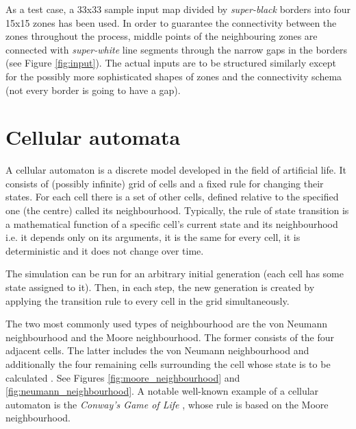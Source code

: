 \documentclass[a4paper, 11pt]{article} %
\begin{document}
As a test case, a 33x33 sample input map divided by \emph{super-black} borders into four 15x15 zones has been used. In order to guarantee the connectivity between the zones throughout the process, middle points of the neighbouring zones are connected with \emph{super-white} line segments through the narrow gaps in the borders (see Figure \ref{fig:input}). The actual inputs are to be structured similarly except for the possibly more sophisticated shapes of zones and the connectivity schema (not every border is going to have a gap).


\section*{Cellular automata}

A cellular automaton is a discrete model developed in the field of artificial life. It consists of (possibly infinite) grid of cells and a fixed rule for changing their states. For each cell there is a set of other cells, defined relative to the specified one (the centre) called its neighbourhood. Typically, the rule of state transition is a mathematical function of a specific cell's current state and its neighbourhood i.e. it depends only on its arguments, it is the same for every cell, it is deterministic and it does not change over time. 

The simulation can be run for an arbitrary initial generation (each cell has some state assigned to it). Then, in each step, the new generation is created by applying the transition rule to every cell in the grid simultaneously.

The two most commonly used types of neighbourhood are the von Neumann neighbourhood and the Moore neighbourhood. The former consists of the four adjacent cells. The latter includes the von Neumann neighbourhood and additionally the four remaining cells surrounding the cell whose state is to be calculated \cite{wiki}. See Figures \ref{fig:moore_neighbourhood} and \ref{fig:neumann_neighbourhood}. A notable well-known example of a cellular automaton is the \emph{Conway's Game of Life} \cite{conway}, whose rule is based on the Moore neighbourhood.
\end{document}
